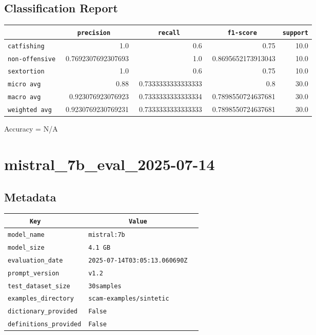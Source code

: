 \documentclass{article}
\begin{document}
\subsection{Classification Report}

\begin{center}
\begin{tabular}{l | r | r | r | r} \hline
    \verb|            | & \verb|    precision     | & \verb|      recall      | & \verb|     f1-score     | & \verb|support| \\ \hline
    \hline
    \verb|catfishing | & 1.0 & 0.6 & 0.75 &    10.0 \\ \hline
    \verb|non-offensive| & 0.7692307692307693 & 1.0 & 0.8695652173913043 &    10.0 \\ \hline
    \verb|sextortion | & 1.0 & 0.6 & 0.75 &    10.0 \\ \hline
    \verb|micro avg  | & 0.88 & 0.7333333333333333 & 0.8 &    30.0 \\ \hline
    \verb|macro avg  | & 0.923076923076923 & 0.7333333333333334 & 0.7898550724637681 &    30.0 \\ \hline
    \verb|weighted avg| & 0.9230769230769231 & 0.7333333333333333 & 0.7898550724637681 &    30.0 \\ \hline
\end{tabular}
\end{center}

\begin{center}
Accuracy = N/A
\end{center}

\section{mistral\_7b\_eval\_2025-07-14}
\subsection{Metadata}

\begin{center}
\begin{tabular}{l | l} \hline
    \verb|      Key      | & \verb|           Value           | \\ \hline
    \hline
    \verb|model_name    | & \verb|mistral:7b                   | \\ \hline
    \verb|model_size    | & \verb|4.1 GB                       | \\ \hline
    \verb|evaluation_date| & \verb|2025-07-14T03:05:13.060690Z  | \\ \hline
    \verb|prompt_version| & \verb|v1.2                         | \\ \hline
    \verb|test_dataset_size| & \verb|30samples                    | \\ \hline
    \verb|examples_directory| & \verb|scam-examples/sintetic       | \\ \hline
    \verb|dictionary_provided| & \verb|False                        | \\ \hline
    \verb|definitions_provided| & \verb|False                        | \\ \hline
\end{tabular}
\end{center}
\end{document}
